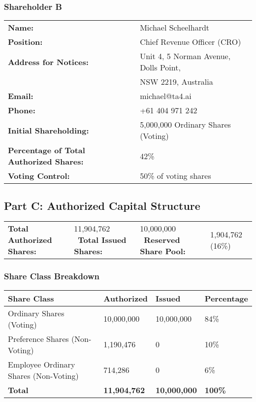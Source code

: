 \vspace{1em}

\subsubsection*{Shareholder B}
\begin{tabularx}{\textwidth}{@{} l X @{}}
\textbf{Name:} & Michael Scheelhardt \\
\textbf{Position:} & Chief Revenue Officer (CRO) \\
\textbf{Address for Notices:} & Unit 4, 5 Norman Avenue, Dolls Point, \\
& NSW 2219, Australia \\
\textbf{Email:} & michael@ta4.ai \\
\textbf{Phone:} & +61 404 971 242 \\
\textbf{Initial Shareholding:} & 5,000,000 Ordinary Shares (Voting) \\
\textbf{Percentage of Total Authorized Shares:} & 42\% \\
\textbf{Voting Control:} & 50\% of voting shares
\end{tabularx}

\vspace{1em}

\subsection*{Part C: Authorized Capital Structure}
\begin{tabularx}{\textwidth}{@{} l X @{}}
\textbf{Total Authorized Shares:} & 11,904,762 \
\textbf{Total Issued Shares:} & 10,000,000 \
\textbf{Reserved Share Pool:} & 1,904,762 (16\%)
\end{tabularx}

\vspace{1em}

\subsubsection*{Share Class Breakdown}
\begin{tabularx}{\textwidth}{@{} l l l l @{}}
\textbf{Share Class} & \textbf{Authorized} & \textbf{Issued} & \textbf{Percentage} \\
\hline
Ordinary Shares (Voting) & 10,000,000 & 10,000,000 & 84\% \\
Preference Shares (Non-Voting) & 1,190,476 & 0 & 10\% \\
Employee Ordinary Shares (Non-Voting) & 714,286 & 0 & 6\% \\
\hline
\textbf{Total} & \textbf{11,904,762} & \textbf{10,000,000} & \textbf{100\%} \\
\end{tabularx}

